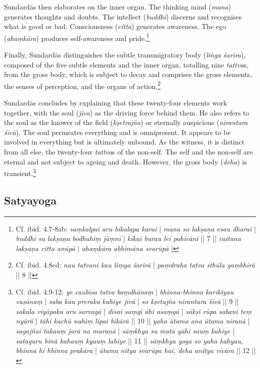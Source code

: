 Sundardās then elaborates on the inner organ. The thinking mind (\textit{mana}) generates thoughts and doubts. The intellect (\textit{buddhi}) discerns and recognises what is good or bad. Consciousness (\textit{citta}) generates awareness. The ego (\textit{ahaṃkāra}) produces self-awareness and pride.\footnote{Cf. ibid. 4.7-8ab: \textit{saṃkalpai aru bikalapa karai} | \textit{mana so lakṣaṇa esau dharai} | \textit{buddhi su lakṣaṇa bodhahiṃ jāṃnī} | \textit{kīkai burau leī pahicānī} || 7 || \textit{caitana lakṣaṇa citta anūpā} | \textit{ahaṃkāra abhimāna svarūpā} |}

Finally, Sundardās distinguishes the subtle transmigratory body (\textit{liṅga śarīra}), composed of the five subtle elements and the inner organ, totalling nine \textit{tattva}s, from the gross body, which is subject to decay and comprises the gross elements, the senses of perception, and the organs of action.\footnote{Cf. ibid. 4.8cd: \textit{nau tatvani kau liṃga śarīrā} | \textit{paṃdraha tatva sthūla gaṃbhīrā} || 8 ||}

Sundardās concludes by explaining that these twenty-four elements work together, with the soul (\textit{jīva}) as the driving force behind them. He also refers to the soul as the knower of the field (\textit{kṣetrajña}) or eternally auspicious (\textit{nirantara śīvā}). The soul permeates everything and is omnipresent. It appears to be involved in everything but is ultimately unbound. As the witness, it is distinct from all else, the twenty-four \textit{tattva}s of the non-self. The self and the non-self are eternal and not subject to ageing and death. However, the gross body (\textit{deha}) is transient.\footnote{Cf. ibid. 4.9-12: \textit{ye caubīsa tatva baṃdhānaṃ} | \textit{bhinna-bhinna karikiyau vaṣānaṃ} | \textit{saba kau preraka kahiye jīvā} | \textit{so kṣetajña nirantara śīvā} || 9 || \textit{sakala viyāpaka aru sarvagā} | \textit{dīsai saṃgī āhi asaṃgā} | \textit{sākṣī rūpa sabani teṃ nyārā} | \textit{tāhi kachū nahiṃ lipai bikārā} || 10 || \textit{yaha ātama ana ātama niranā} | \textit{sagajñai takauṃ jarā na maraṇā} | \textit{sāṃkhya su mata yāhī sauṃ kahiye} | \textit{sataguru binā kahauṃ kyauṃ lahiye} || 11 || \textit{sāṃkhya yoga so yaha kahyau, bhinna hi hbinna prakāra} | \textit{ātama nitya svarūpa hai, deha anitya vicāra} || 12 ||}

\subsection{Satyayoga}
\label{satyayoga}

